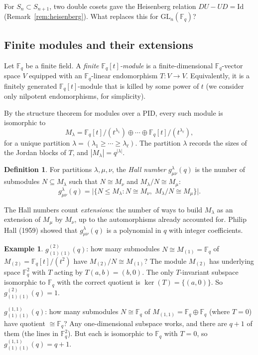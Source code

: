\documentclass[12pt,a4paper]{article}
\theoremstyle{definition}
\newtheorem{definition}[theorem]{Definition}
\newtheorem{example}[theorem]{Example}
\theoremstyle{remark}
\newcommand{\F}{\mathbb{F}}
\newcommand{\GL}{\mathrm{GL}}
\begin{document}
For $S_n \subset S_{n+1}$, two double cosets gave the Heisenberg
relation $DU - UD = \mathrm{Id}$ (Remark~\ref{rem:heisenberg}). What
replaces this for $\GL_n(\F_q)$?

\subsection{Finite modules and their extensions}

Let $\F_q$ be a finite field. A \emph{finite $\F_q[t]$-module} is a
finite-dimensional $\F_q$-vector space $V$ equipped with an
$\F_q$-linear endomorphism $T : V \to V$. Equivalently, it is a
finitely generated $\F_q[t]$-module that is killed by some power of
$t$ (we consider only nilpotent endomorphisms, for simplicity).

By the structure theorem for modules over a PID, every such module is
isomorphic to
\[
  M_\lambda = \F_q[t]/(t^{\lambda_1}) \oplus \cdots \oplus
  \F_q[t]/(t^{\lambda_\ell}),
\]
for a unique partition $\lambda = (\lambda_1 \geqslant \cdots
\geqslant \lambda_\ell)$. The partition $\lambda$ records the sizes
of the Jordan blocks of $T$, and $|M_\lambda| = q^{|\lambda|}$.

\begin{definition}\label{def:hall-number}
For partitions $\lambda, \mu, \nu$, the \emph{Hall number}
$g^\lambda_{\mu\nu}(q)$ is the number of submodules
$N \subseteq M_\lambda$ such that $N \cong M_\nu$ and
$M_\lambda / N \cong M_\mu$:
\[
  g^\lambda_{\mu\nu}(q) = \bigl|\{N \leqslant M_\lambda :
  N \cong M_\nu,\; M_\lambda/N \cong M_\mu\}\bigr|.
\]
\end{definition}

The Hall numbers count \emph{extensions}: the number of ways to
build $M_\lambda$ as an extension of $M_\mu$ by $M_\nu$, up to the
automorphisms already accounted for. Philip Hall (1959) showed that
$g^\lambda_{\mu\nu}(q)$ is a polynomial in $q$ with integer
coefficients.

\begin{example}\label{ex:hall-number}
$g^{(2)}_{(1)(1)}(q)$: how many submodules $N \cong M_{(1)} = \F_q$
of $M_{(2)} = \F_q[t]/(t^2)$ have $M_{(2)}/N \cong M_{(1)}$? The
module $M_{(2)}$ has underlying space $\F_q^2$ with $T$ acting by
$T(a,b) = (b, 0)$. The only $T$-invariant subspace isomorphic to
$\F_q$ with the correct quotient is $\ker(T) = \{(a, 0)\}$.
So $g^{(2)}_{(1)(1)}(q) = 1$.

$g^{(1,1)}_{(1)(1)}(q)$: how many submodules $N \cong \F_q$ of
$M_{(1,1)} = \F_q \oplus \F_q$ (where $T = 0$) have quotient
$\cong \F_q$? Any one-dimensional subspace works, and there are
$q + 1$ of them (the lines in $\F_q^2$). But each is isomorphic to
$\F_q$ with $T = 0$, so $g^{(1,1)}_{(1)(1)}(q) = q + 1$.
\end{example}
\end{document}
